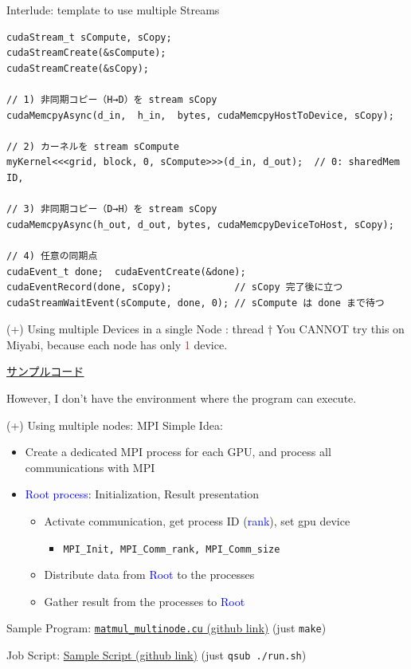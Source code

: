 \documentclass[dvipdfmx, 11pt, aspectratio=169]{beamer}   %
\begin{document}
\begin{frame}[fragile]{Interlude: template to use multiple Streams}
  \begin{lstlisting}[language=CUDA]
cudaStream_t sCompute, sCopy;
cudaStreamCreate(&sCompute);
cudaStreamCreate(&sCopy);

// 1) 非同期コピー（H→D）を stream sCopy
cudaMemcpyAsync(d_in,  h_in,  bytes, cudaMemcpyHostToDevice, sCopy);

// 2) カーネルを stream sCompute
myKernel<<<grid, block, 0, sCompute>>>(d_in, d_out);  // 0: sharedMem ID, 

// 3) 非同期コピー（D→H）を stream sCopy
cudaMemcpyAsync(h_out, d_out, bytes, cudaMemcpyDeviceToHost, sCopy);

// 4) 任意の同期点
cudaEvent_t done;  cudaEventCreate(&done);
cudaEventRecord(done, sCopy);           // sCopy 完了後に立つ
cudaStreamWaitEvent(sCompute, done, 0); // sCompute は done まで待つ
\end{lstlisting}
\end{frame}
\begin{frame}{(+) Using multiple Devices in a single Node : thread}
  † You CANNOT try this on Miyabi, because each node has only \textcolor{red}{1} device.

  \href{https://github.com/gunnersgoestocl/cuda-introduction/blob/main/matmul-advanced/matmul_multidevice.cu}{\uline{サンプルコード}}

  However, I don't have the environment where the program can execute.
\end{frame}
\begin{frame}[fragile]{(+) Using multiple nodes: MPI}
  Simple Idea:
  \begin{itemize}
    \item Create a dedicated MPI process for each GPU, and process all communications with MPI
    \item \textcolor{blue}{Root process}: Initialization, Result presentation
    \begin{itemize}
      \item Activate communication, get process ID (\textcolor{blue}{rank}), set gpu device
      \begin{itemize}
        \item \lstinline|MPI_Init, MPI_Comm_rank, MPI_Comm_size|
      \end{itemize}
      \item Distribute data from \textcolor{blue}{Root} to the processes
      \item Gather result from the processes to \textcolor{blue}{Root}
    \end{itemize}
  \end{itemize}
  Sample Program: 
  \href{https://github.com/gunnersgoestocl/cuda-introduction/blob/main/matmul-advanced/matmul_multinode.cu}{\uline{\lstinline|matmul_multinode.cu| (github link)}} (just \lstinline|make|) 

  Job Script:
  \href{https://github.com/gunnersgoestocl/cuda-introduction/blob/main/matmul-advanced/run.sh}{Sample Script (github link)} (just \lstinline|qsub ./run.sh|)
\end{frame}
\end{document}
